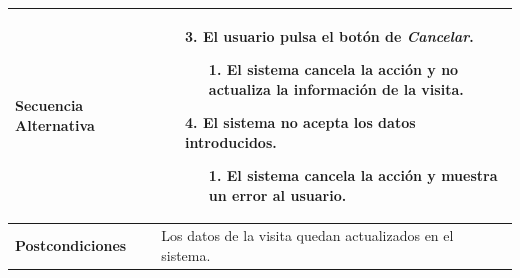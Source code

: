 \begin{longtable}{| p{4cm} | p{10cm} |}
\\
\hline
\textbf{Secuencia Alternativa} &\mbox{}\par\vspace{-\baselineskip}
\begin{enumerate}[leftmargin=0.9cm, topsep=0.1cm]
\item[3.] El usuario pulsa el botón de \textit{Cancelar}.
	\begin{itemize}
	\item[1.] El sistema cancela la acción y no actualiza la información de la visita.
	\end{itemize}
\item[4.] El sistema no acepta los datos introducidos.
	\begin{itemize}
	\item[1.] El sistema cancela la acción y muestra un error al usuario.
	\end{itemize}
\end{enumerate}
\\

\hline
\textbf{Postcondiciones} & 
Los datos de la visita quedan actualizados en el sistema.\\
\hline
\end{longtable}



\newpage
